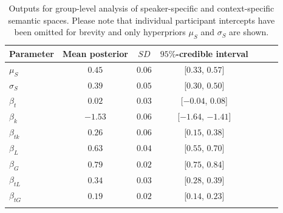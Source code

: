 \documentclass[pdflatex,sn-mathphys]{sn-jnl}
\begin{document}
\begin{table}[t]
\begin{center}
\begin{minipage}{\textwidth}
\caption{Outputs for group-level analysis of speaker-specific and context-specific semantic spaces. Please note that individual participant intercepts have been omitted for brevity and only hyperpriors $\mu_S$ and $\sigma_S$ are shown.}\label{tab6}
\begin{tabular*}{\textwidth}{@{\extracolsep{\fill}}lcccccc@{\extracolsep{\fill}}}
\toprule%
Parameter & Mean posterior & $SD$ & $95\%$-credible interval \\
\midrule
$\mu_S$ & $0.45$ & $0.06$ & [$0.33$, $0.57$] \\
$\sigma_S$ & $0.39$ & $0.05$ & [$0.30$, $0.50$] \\
$\beta_t$ & $0.02$ & $0.03$ & [$-0.04$, $0.08$] \\
$\beta_k$ & $-1.53$ & $0.06$ & [$-1.64$, $-1.41$] \\
$\beta_{tk}$ & $0.26$ & $0.06$ & [$0.15$, $0.38$] \\
$\beta_L$ & $0.63$ & $0.04$ & [$0.55$, $0.70$] \\
$\beta_G$ & $0.79$ & $0.02$ & [$0.75$, $0.84$] \\
$\beta_{tL}$ & $0.34$ & $0.03$ & [$0.28$, $0.39$] \\
$\beta_{tG}$ & $0.19$ & $0.02$ & [$0.14$, $0.23$] \\
\botrule
\end{tabular*}
\end{minipage}
\end{center}
\end{table}
\end{document}
